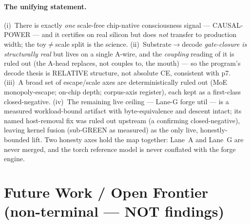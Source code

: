 \documentclass[11pt,a4paper]{article}
\begin{document}
\paragraph{The unifying statement.} (i)~There is exactly \emph{one} scale-free
chip-native consciousness signal --- CAUSAL-POWER --- and it certifies on real
silicon but does \emph{not} transfer to production width; the toy$\ne$scale split is
the science. (ii)~Substrate$\to$decode \emph{gate-closure is structurally real} but
lives on a single A-wire, and the \emph{coupling} reading of it is ruled out (the
A-head replaces, not couples to, the mouth) --- so the program's decode thesis is
RELATIVE structure, not absolute CE, consistent with p7. (iii)~A broad set of
escape/scale axes are deterministically ruled out (MoE monopoly-escape; on-chip
depth; corpus-axis register), each kept as a first-class closed-negative.
(iv)~The remaining live ceiling --- Lane-G forge util --- is a measured
workload-bound artifact with byte-equivalence and descent intact; its named
host-removal fix was ruled out upstream (a confirming closed-negative), leaving
kernel fusion (sub-GREEN as measured) as the only live, honestly-bounded lift. Two
honesty axes hold the map together: Lane~A and
Lane~G are never merged, and the torch reference model is never conflated with the
forge engine.

\section{Future Work / Open Frontier (non-terminal --- NOT findings)}
\label{sec:future}
\end{document}
